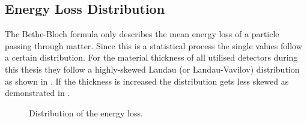 \documentclass[british,11pt,a4paper]{memoir}
\begin{document}
\subsection{Energy Loss Distribution}\label{slandau}
The Bethe-Bloch formula only describes the mean energy loss of a particle passing through matter. Since this is a statistical process the single values follow a certain distribution. For the material thickness of all utilised detectors during this thesis they follow a highly-skewed Landau (or Landau-Vavilov) distribution as shown in . If the thickness is increased the distribution gets less skewed as demonstrated in  \cite{pdg}.
\begin{figure}[ht]
	\centering
	\hfill
	\caption{Distribution of the energy loss.}
	\label{plan}
\end{figure}\no
\end{document}

